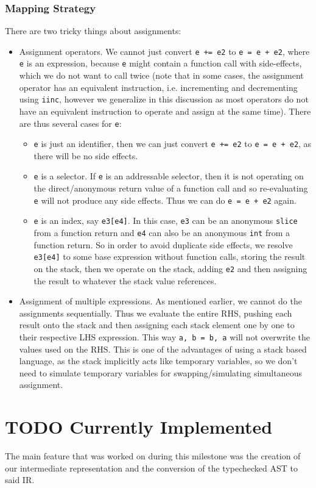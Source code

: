 \documentclass[11pt]{article}
\begin{document}
\subsubsection{Mapping Strategy}
\label{sec:org3f93310}
There are two tricky things about assignments:
\begin{itemize}
\item Assignment operators. We cannot just convert \texttt{e += e2} to \texttt{e =
      e + e2}, where \texttt{e} is an expression, because \texttt{e} might contain a
function call with side-effects, which we do not want to call
twice (note that in some cases, the assignment operator has an
equivalent instruction, i.e. incrementing and decrementing using
\texttt{iinc}, however we generalize in this discussion as most
operators do not have an equivalent instruction to operate and
assign at the same time). There are thus several cases for \texttt{e}:
\begin{itemize}
\item \texttt{e} is just an identifier, then we can just convert \texttt{e += e2}
to \texttt{e = e + e2}, as there will be no side effects.
\item \texttt{e} is a selector. If \texttt{e} is an addressable selector, then it
is not operating on the direct/anonymous return value of a
function call and so re-evaluating \texttt{e} will not produce any
side effects. Thus we can do \texttt{e = e + e2} again.
\item \texttt{e} is an index, say \texttt{e3[e4]}. In this case, \texttt{e3} can be an
anonymous \texttt{slice} from a function return and \texttt{e4} can also be an
anonymous \texttt{int} from a function return. So in order to avoid
duplicate side effects, we resolve \texttt{e3[e4]} to some base
expression without function calls, storing the result on the
stack, then we operate on the stack, adding \texttt{e2} and then
assigning the result to whatever the stack value references.
\end{itemize}
\item Assignment of multiple expressions. As mentioned earlier, we
cannot do the assignments sequentially. Thus we evaluate the
entire RHS, pushing each result onto the stack and then
assigning each stack element one by one to their respective LHS
expression. This way \texttt{a, b = b, a} will not overwrite the values
used on the RHS. This is one of the advantages of using a stack
based language, as the stack implicitly acts like temporary
variables, so we don't need to simulate temporary variables for
swapping/simulating simultaneous assignment.
\end{itemize}
\section{{\bfseries\sffamily TODO} Currently Implemented}
\label{sec:org4ed9cbd}
The main feature that was worked on during this milestone was the
creation of our intermediate representation and the conversion of
the typechecked AST to said IR.
\end{document}
